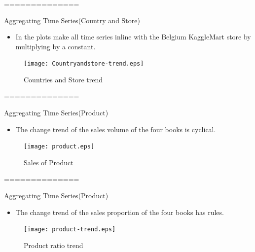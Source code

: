 \documentclass[
 size=14pt,
 paper=smartboard,  %
 mode=present, 		%
 display=slides, 	%
 style=tuliplab,  	%
 pauseslide,
 fleqn,leqno]{powerdot}
\begin{document}
==============
\begin{slide}[toc=,bm=]{Aggregating Time Series(Country and Store)}
	\begin{itemize}
		\item
		In the plots make all time series inline with the Belgium KaggleMart store by multiplying by a constant.
	\end{itemize}
		\begin{figure}
			\centering
			\texttt{[image: Countryandstore-trend.eps]}
			\caption{Countries and Store trend}\label{fig:OutAspect-target}
		\end{figure}
\end{slide}

==============
\begin{slide}[toc=,bm=]{Aggregating Time Series(Product)}
	\begin{itemize}
		\item
		The change trend of the sales volume of the four books is cyclical.
	\end{itemize}

		\begin{figure}
			\centering
			\texttt{[image: product.eps]}
			\caption{Sales of Product}\label{fig:OutAspect-target}
		\end{figure}

\end{slide}

==============
\begin{slide}[toc=,bm=]{Aggregating Time Series(Product)}
	\begin{itemize}
		\item
		The change trend of the sales proportion of the four books has rules.
	\end{itemize}
		\begin{figure}
			\centering
			\texttt{[image: product-trend.eps]}
			\caption{Product ratio trend}\label{fig:OutAspect-target}
		\end{figure}
\end{slide}
\end{document}
